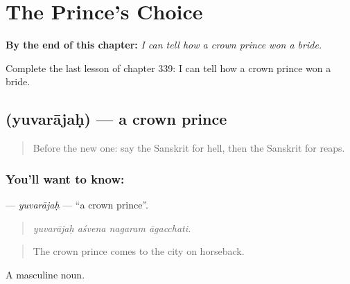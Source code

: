
\chapter{The Prince's Choice}
\label{ch:sa-the-prince-s-choice}

\begin{chapteropening}
\textbf{By the end of this chapter:} \emph{I can tell how a crown prince won a bride.}

Complete the last lesson of chapter 339: I can tell how a crown prince won a bride.
\end{chapteropening}

\section[\texorpdfstring{\sk{युवराजः} (yuvarājaḥ)}{युवराजः (yuvarājaḥ)}]{ (yuvarājaḥ) — a crown prince}

\label{lesson:SA-C339-yuvarajah}



\begin{quote}
Before the new one: say the Sanskrit for hell, then the Sanskrit for reaps.
\end{quote}

\subsection*{You'll want to know: }
\textbf{} — \emph{yuvarājaḥ} — \textquotedblleft{}a crown prince\textquotedblright{}.

\begin{quote}
   
\end{quote}

\begin{quote}
\emph{yuvarājaḥ aśvena nagaram āgacchati.}
\end{quote}

\begin{quote}
The crown prince comes to the city on horseback.
\end{quote}

A masculine noun.

